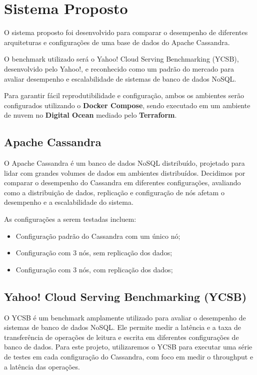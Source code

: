 \section{Sistema Proposto}

O sistema proposto foi desenvolvido para comparar o desempenho de diferentes arquiteturas e configurações de uma base de dados do Apache Cassandra.

O benchmark utilizado será o Yahoo! Cloud Serving Benchmarking (YCSB), desenvolvido pelo Yahoo!,
e reconhecido como um padrão do mercado para avaliar desempenho e escalabilidade de sistemas 
de banco de dados NoSQL. 

Para garantir fácil reprodutibilidade e configuração, 
ambos os ambientes serão configurados utilizando o \textbf{Docker Compose}, sendo executado em um ambiente de nuvem no \textbf{Digital Ocean} 
mediado pelo \textbf{Terraform}.

\subsection{Apache Cassandra}
	O Apache Cassandra é um banco de dados NoSQL distribuído, projetado para lidar com grandes volumes de dados em ambientes distribuídos.
	Decidimos por comparar o desempenho do Cassandra em diferentes configurações,
	avaliando como a distribuição de dados, replicação e configuração de nós afetam o desempenho e a escalabilidade do sistema.

	As configurações a serem testadas incluem:
	\begin{itemize}
		\item Configuração padrão do Cassandra com um único nó;
		\item Configuração com 3 nós, sem replicação dos dados;
		\item Configuração com 3 nós, com replicação dos dados;
	\end{itemize}

\subsection{Yahoo! Cloud Serving Benchmarking (YCSB)}
	O YCSB é um benchmark amplamente utilizado para avaliar o desempenho de sistemas de banco de dados NoSQL.
	Ele permite medir a latência e a taxa de transferência de operações de leitura e escrita em diferentes configurações de banco de dados.
	Para este projeto, utilizaremos o YCSB para executar uma série de testes em cada configuração do Cassandra,
	com foco em medir o throughput e a latência das operações.

